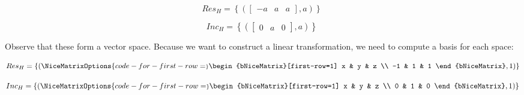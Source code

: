 \vspace*{-0.5em}
\begin{center}
	\begin{minipage}{0.5\linewidth}
		\begin{equation*}
			Res_H = \left\{ (\begin{bmatrix} -a & a & a \end{bmatrix}, a) \right\}\
		\end{equation*}
	\end{minipage}
	\begin{minipage}{0.4\linewidth}
		\begin{equation*}
			Inc_H = \left\{ (\begin{bmatrix} 0 & a & 0 \end{bmatrix}, a) \right\}\ 
		\end{equation*}
	\end{minipage}
\end{center}
Observe that these form a vector space. Because we want to construct a linear transformation, we need to compute a basis for each space:
\vspace*{-1em}
\begin{center}
	\begin{minipage}{0.5\linewidth}
	\begin{equation*}
		Res_H = \{(
		\NiceMatrixOptions{code-for-first-row=\scriptstyle}
			\begin{bNiceMatrix}[first-row=1]
				 x & y & z \\
				 -1 & 1 & 1 
			\end{bNiceMatrix}, 1)\}
	\end{equation*}
	\end{minipage}
	\begin{minipage}{0.4\linewidth}
	\begin{equation*}
	    Inc_H = \{(
	    \NiceMatrixOptions{code-for-first-row=\scriptstyle}
	    	\begin{bNiceMatrix}[first-row=1] 
	    		x & y & z \\
	    		 0 & 1 & 0 
	    	 \end{bNiceMatrix}, 1)\}
	\end{equation*}
	\end{minipage}
\end{center}

